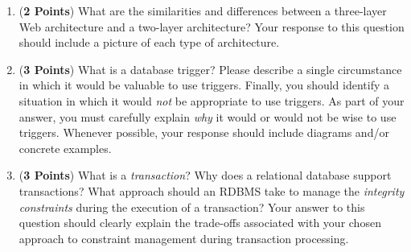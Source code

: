 \documentclass[12pt]{article}
\begin{document}
\begin{enumerate}
\begin{enumerate}
    \item ({\bf 2 Points}) What are the similarities and differences
      between a three-layer Web architecture and a two-layer
      architecture?  Your response to this question should include a
      picture of each type of architecture.



    \item ({\bf 3 Points}) What is a database trigger?  Please
      describe a single circumstance in which it would be valuable to
      use triggers.  Finally, you should identify a situation in which
      it would {\em not} be appropriate to use triggers.  As part of
      your answer, you must carefully explain {\em why} it would or
      would not be wise to use triggers.  Whenever possible, your
      response should include diagrams and/or concrete examples.


    \item ({\bf 3 Points}) What is a {\em transaction}?  Why does a
      relational database support transactions?  What approach should
      an RDBMS take to manage the {\em integrity constraints} during
      the execution of a transaction?  Your answer to this question
      should clearly explain the trade-offs associated with your
      chosen approach to constraint management during transaction
      processing.


\end{enumerate}
\end{enumerate}
\end{document}
